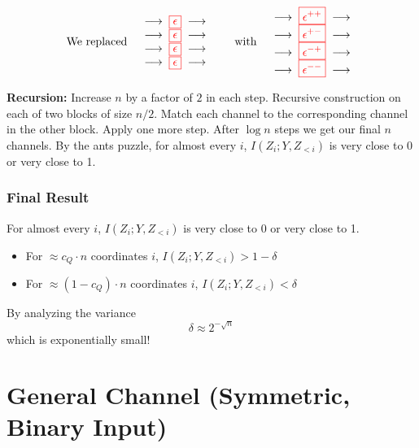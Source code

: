 \documentclass{article}
\begin{document}
\[
\text{We replaced}\quad
\begin{array}{c@{\;\;}c@{\;\;}c}
\longrightarrow & {\color{red}\boxed{\epsilon}} & \longrightarrow \\
\longrightarrow & {\color{red}\boxed{\epsilon}} & \longrightarrow \\
\longrightarrow & {\color{red}\boxed{\epsilon}} & \longrightarrow \\
\longrightarrow & {\color{red}\boxed{\epsilon}} & \longrightarrow
\end{array}
\qquad\text{with}\quad
\begin{array}{c@{\;\;}c@{\;\;}c}
\longrightarrow & {\color{red}\boxed{\epsilon^{{+}{+}}}} & \longrightarrow \\
\longrightarrow & {\color{red}\boxed{\epsilon^{{+}{-}}}} & \longrightarrow \\
\longrightarrow & {\color{red}\boxed{\epsilon^{{-}{+}}}} & \longrightarrow \\
\longrightarrow & {\color{red}\boxed{\epsilon^{{-}{-}}}} & \longrightarrow
\end{array}
\]

\textbf{Recursion:} Increase $n$ by a factor of $2$ in each step. Recursive construction on each of two blocks of size $n/2$. Match each channel to the corresponding channel in the other block. Apply one more step. After $\log n$ steps we get our final $n$ channels. By the ants puzzle, for almost every $i$, $I(Z_i; Y, Z_{<i})$ is very close to 0 or very close to 1.

\subsubsection{Final Result}
For almost every $i$, $I(Z_i; Y, Z_{<i})$ is very close to 0 or very close to 1.
\begin{itemize}
    \item For $\approx c_Q\cdot n$ coordinates $i$, $I(Z_i; Y,Z_{<i})> 1-\delta$
    \item For $\approx (1-c_Q)\cdot n$ coordinates $i$, $I(Z_i; Y,Z_{<i}) < \delta$
\end{itemize}
By analyzing the variance 
\[
\delta \approx 2^{-\sqrt{n}}
\]
which is exponentially small!

\section{General Channel (Symmetric, Binary Input)}
\end{document}
